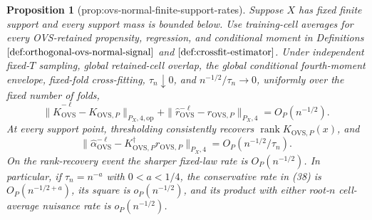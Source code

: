 \documentclass{article}
\newtheorem{proposition}{Proposition}
\begin{document}
\begin{proposition}[prop:ovs-normal-finite-support-rates]\label{prop:ovs-normal-finite-support-rates}
Suppose \(X\) has fixed finite support and every support mass is bounded below.  Use training-cell averages for every OVS-retained propensity, regression, and conditional moment in Definitions \(\ref{def:orthogonal-ovs-normal-signal}\) and \(\ref{def:crossfit-estimator}\).  Under independent fixed-\(T\) sampling, global retained-cell overlap, the global conditional fourth-moment envelope, fixed-fold cross-fitting, \(\tau_n\downarrow0\), and \(n^{-1/2}/\tau_n\to0\), uniformly over the fixed number of folds,
\[
\|\widehat K_{\mathrm{OVS}}^{-\ell}-K_{\mathrm{OVS},P}\|_{P_X,4,\mathrm{op}}
+\|\widehat r_{\mathrm{OVS}}^{-\ell}-r_{\mathrm{OVS},P}\|_{P_X,4}
=O_P(n^{-1/2}).
\tag{37}
\]
At every support point, thresholding consistently recovers \(\operatorname{rank}K_{\mathrm{OVS},P}(x)\), and
\[
\|\widehat\alpha_{\mathrm{OVS}}^{-\ell}
-K_{\mathrm{OVS},P}^\dagger r_{\mathrm{OVS},P}\|_{P_X,4}
=O_P(n^{-1/2}/\tau_n).
\tag{38}
\]
On the rank-recovery event the sharper fixed-law rate is \(O_P(n^{-1/2})\).  In particular, if \(\tau_n=n^{-a}\) with \(0<a<1/4\), the conservative rate in (38) is \(O_P(n^{-1/2+a})\), its square is \(o_P(n^{-1/2})\), and its product with either root-\(n\) cell-average nuisance rate is \(o_P(n^{-1/2})\).
\end{proposition}
\end{document}
